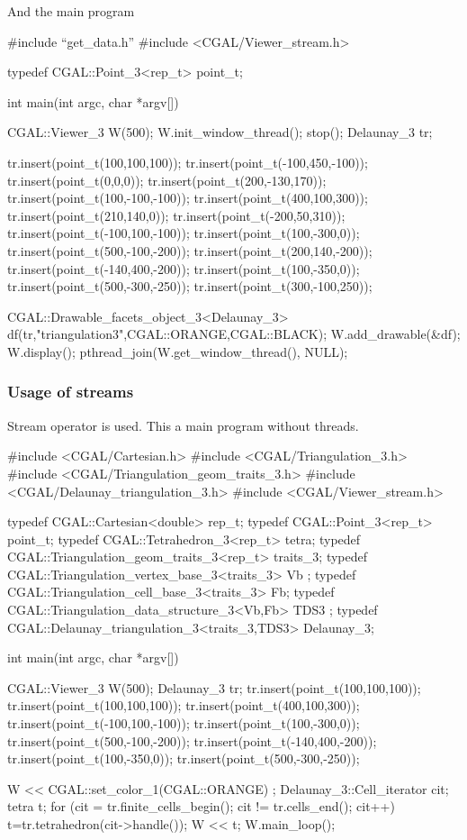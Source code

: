 And the main program
\begin{cprog} 

#include ``get_data.h''
#include <CGAL/Viewer_stream.h>

typedef CGAL::Point_3<rep_t> point_t;

int main(int argc, char *argv[]) 
{
  CGAL::Viewer_3 W(500);
  W.init_window_thread();
  stop();
  Delaunay_3 tr;
  
  tr.insert(point_t(100,100,100));
  tr.insert(point_t(-100,450,-100));
  tr.insert(point_t(0,0,0));
  tr.insert(point_t(200,-130,170));
  tr.insert(point_t(100,-100,-100));
  tr.insert(point_t(400,100,300));
  tr.insert(point_t(210,140,0));
  tr.insert(point_t(-200,50,310));
  tr.insert(point_t(-100,100,-100));
  tr.insert(point_t(100,-300,0));
  tr.insert(point_t(500,-100,-200));
  tr.insert(point_t(200,140,-200));
  tr.insert(point_t(-140,400,-200));
  tr.insert(point_t(100,-350,0));
  tr.insert(point_t(500,-300,-250));
  tr.insert(point_t(300,-100,250));

  CGAL::Drawable_facets_object_3<Delaunay_3>
                     df(tr,"triangulation3",CGAL::ORANGE,CGAL::BLACK);
  W.add_drawable(&df);
  W.display();
  pthread_join(W.get_window_thread(), NULL);
}

\end{cprog} 

\subsubsection{Usage of streams}
Stream operator \ccc{<<} is used. This a main program without threads.
\begin{cprog} 

#include <CGAL/Cartesian.h>
#include <CGAL/Triangulation_3.h>
#include <CGAL/Triangulation_geom_traits_3.h>
#include <CGAL/Delaunay_triangulation_3.h>
#include <CGAL/Viewer_stream.h>

typedef CGAL::Cartesian<double> rep_t;
typedef CGAL::Point_3<rep_t> point_t;
typedef CGAL::Tetrahedron_3<rep_t> tetra;
typedef CGAL::Triangulation_geom_traits_3<rep_t>  traits_3;
typedef CGAL::Triangulation_vertex_base_3<traits_3>     Vb ;
typedef CGAL::Triangulation_cell_base_3<traits_3>       Fb;
typedef CGAL::Triangulation_data_structure_3<Vb,Fb> TDS3 ;
typedef CGAL::Delaunay_triangulation_3<traits_3,TDS3> Delaunay_3;

int main(int argc, char *argv[]) 
{
  CGAL::Viewer_3 W(500);
  Delaunay_3 tr;  
  tr.insert(point_t(100,100,100));
  tr.insert(point_t(100,100,100));
  tr.insert(point_t(400,100,300));
  tr.insert(point_t(-100,100,-100));
  tr.insert(point_t(100,-300,0));
  tr.insert(point_t(500,-100,-200));
  tr.insert(point_t(-140,400,-200));
  tr.insert(point_t(100,-350,0));
  tr.insert(point_t(500,-300,-250));

  W << CGAL::set_color_1(CGAL::ORANGE) ;
  Delaunay_3::Cell_iterator cit;
  tetra t;
  for (cit = tr.finite_cells_begin(); cit != tr.cells_end(); cit++) {
    t=tr.tetrahedron(cit->handle());
    W << t;
  }
 W.main_loop();
}
\end{cprog} 

